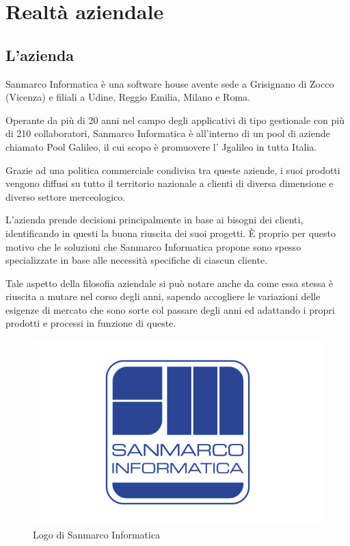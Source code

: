 
\chapter{Realtà aziendale}
\label{cap:realta}


\section{L'azienda}

Sanmarco Informatica è una software house avente sede a Grisignano di Zocco
(Vicenza) e filiali a Udine, Reggio Emilia, Milano e Roma.

Operante da più di 20 anni nel campo degli applicativi di tipo gestionale con
più di 210 collaboratori, Sanmarco Informatica è all'interno di un pool di
aziende chiamato Pool Galileo, il cui scopo è promuovere l' Jgalileo in
tutta Italia.

Grazie ad una politica commerciale condivisa tra queste aziende, i suoi
prodotti vengono diffusi su tutto il territorio nazionale a clienti di diversa
dimensione e diverso settore merceologico.

L'azienda prende decisioni principalmente in base ai bisogni dei clienti,
identificando in questi la buona riuscita dei suoi progetti. È proprio per
questo motivo che le soluzioni che Sanmarco Informatica propone sono spesso
specializzate in base alle necessità specifiche di ciascun cliente.

Tale aspetto della filosofia aziendale si può notare anche da come essa stessa
è riuscita a mutare nel corso degli anni, sapendo accogliere le variazioni
delle esigenze di mercato che sono sorte col passare degli anni ed adattando i
propri prodotti e processi in funzione di queste.

\begin{figure}[H]%
\centering
\includegraphics[width=.5\columnwidth]{immagini/logo-sanmarco.jpg}
\caption{Logo di Sanmarco Informatica}%
\label{fig:logo-smi}%
\end{figure}

